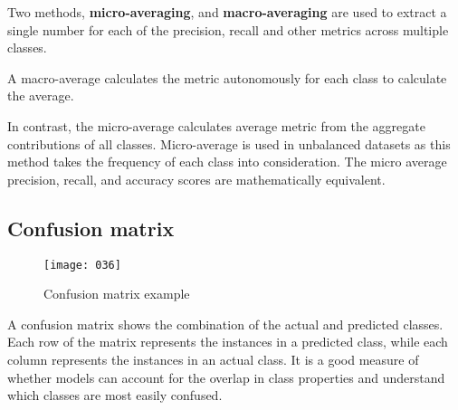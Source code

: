 Two methods, \textbf{micro-averaging}, and \textbf{macro-averaging} are used to extract a single number for each of the precision, recall and other metrics across multiple classes.

A macro-average calculates the metric autonomously for each class to calculate the average. 

In contrast, the micro-average calculates average metric from the aggregate contributions of all classes. Micro-average is used in unbalanced datasets as this method takes the frequency of each class into consideration. The micro average precision, recall, and accuracy scores are mathematically equivalent.

\subsection{Confusion matrix}

\begin{figure}[t]
\begin{center}
	\texttt{[image: 036]}
	\vspace*{-25pt}
\end{center}
\caption{Confusion matrix example}
\label{fig:036}
\end{figure}
A confusion matrix shows the combination of the actual and predicted classes. Each row of the matrix represents the instances in a predicted class, while each column represents the instances in an actual class. It is a good measure of whether models can account for the overlap in class properties and understand which classes are most easily confused.
